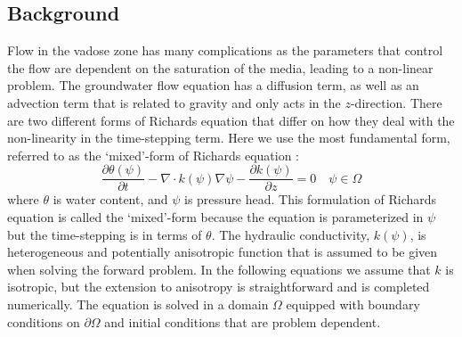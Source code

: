 \documentclass[11pt]{article}
\newcommand{\GRAD}{\nabla}
\newcommand{\DIV}{\nabla \cdot}
\begin{document}
\subsection{Background}

Flow in the vadose zone has many complications as the parameters that control the flow are dependent on the saturation of the media, leading to a non-linear problem. The groundwater flow equation has a diffusion term, as well as an advection term that is related to gravity and only acts in the $z$-direction. There are two different forms of Richards equation that differ on how they deal with the non-linearity in the time-stepping term. Here we use the most fundamental form, referred to as the `mixed'-form of Richards equation \citep{Celia1990}:
\begin{equation}
\label{eq:RichardsMixed}
    \frac{\partial \theta(\psi)}{\partial t} - \DIV k(\psi) \GRAD \psi - \frac{\partial k(\psi)}{\partial z} = 0
    \quad \psi \in \Omega
\end{equation}
\noindent
where $\theta$ is water content, and $\psi$ is pressure head. This formulation of Richards equation is called the `mixed'-form because the equation is parameterized in $\psi$ but the time-stepping is in terms of $\theta$. The hydraulic conductivity, $k(\psi)$, is heterogeneous and potentially anisotropic function that is assumed to be given when solving the forward problem. In the following equations we assume that $k$ is isotropic, but the extension to anisotropy is straightforward and is completed numerically. The equation is solved in a domain $\Omega$ equipped with boundary conditions on $\partial \Omega$ and initial conditions that are problem dependent.
\end{document}
